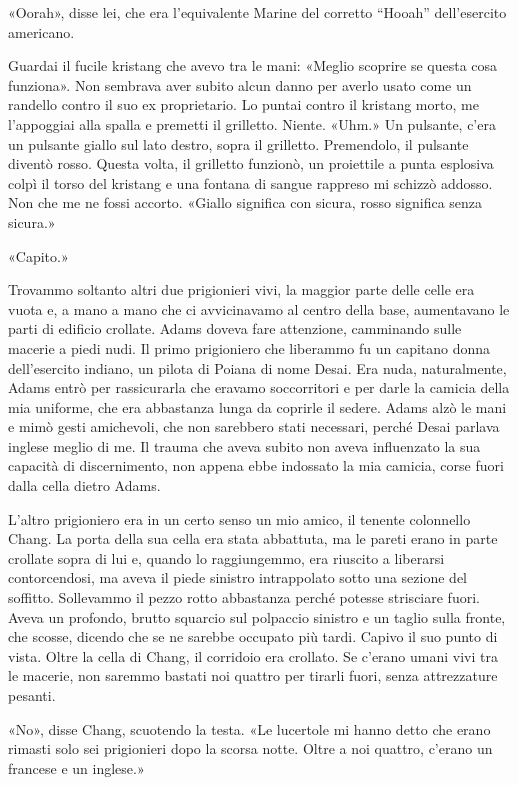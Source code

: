 «Oorah», disse lei, che era l'equivalente Marine del corretto ``Hooah''
dell'esercito americano.

Guardai il fucile kristang che avevo tra le mani: «Meglio scoprire se
questa cosa funziona». Non sembrava aver subito alcun danno per averlo
usato come un randello contro il suo ex proprietario. Lo puntai contro
il kristang morto, me l'appoggiai alla spalla e premetti il grilletto.
Niente. «Uhm.» Un pulsante, c'era un pulsante giallo sul lato destro,
sopra il grilletto. Premendolo, il pulsante diventò rosso. Questa volta,
il grilletto funzionò, un proiettile a punta esplosiva colpì il torso
del kristang e una fontana di sangue rappreso mi schizzò addosso. Non
che me ne fossi accorto. «Giallo significa con sicura, rosso significa
senza sicura.»

«Capito.»

Trovammo soltanto altri due prigionieri vivi, la maggior parte delle
celle era vuota e, a mano a mano che ci avvicinavamo al centro della
base, aumentavano le parti di edificio crollate. Adams doveva fare
attenzione, camminando sulle macerie a piedi nudi. Il primo prigioniero
che liberammo fu un capitano donna dell'esercito indiano, un pilota di
Poiana di nome Desai. Era nuda, naturalmente, Adams entrò per
rassicurarla che eravamo soccorritori e per darle la camicia della mia
uniforme, che era abbastanza lunga da coprirle il sedere. Adams alzò le
mani e mimò gesti amichevoli, che non sarebbero stati necessari, perché
Desai parlava inglese meglio di me. Il trauma che aveva subito non aveva
influenzato la sua capacità di discernimento, non appena ebbe indossato
la mia camicia, corse fuori dalla cella dietro Adams.

L'altro prigioniero era in un certo senso un mio amico, il tenente
colonnello Chang. La porta della sua cella era stata abbattuta, ma le
pareti erano in parte crollate sopra di lui e, quando lo raggiungemmo,
era riuscito a liberarsi contorcendosi, ma aveva il piede sinistro
intrappolato sotto una sezione del soffitto. Sollevammo il pezzo rotto
abbastanza perché potesse strisciare fuori. Aveva un profondo, brutto
squarcio sul polpaccio sinistro e un taglio sulla fronte, che scosse,
dicendo che se ne sarebbe occupato più tardi. Capivo il suo punto di
vista. Oltre la cella di Chang, il corridoio era crollato. Se c'erano
umani vivi tra le macerie, non saremmo bastati noi quattro per tirarli
fuori, senza attrezzature pesanti.

«No», disse Chang, scuotendo la testa. «Le lucertole mi hanno detto che
erano rimasti solo sei prigionieri dopo la scorsa notte. Oltre a noi
quattro, c'erano un francese e un inglese.»

